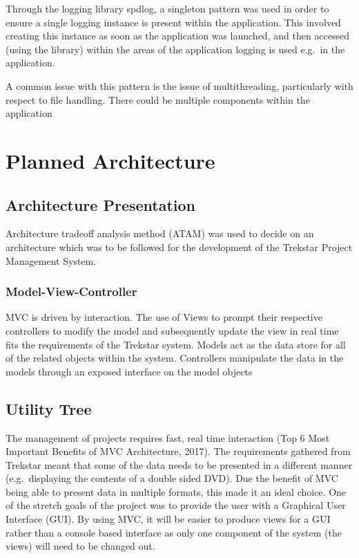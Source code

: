 \documentclass[
  english,
  a4paper,
,tablecaptionabove
]{scrartcl}
\begin{document}
Through the logging library spdlog, a singleton pattern was used in
order to ensure a single logging instance is present within the
application. This involved creating this instance as soon as the
application was launched, and then accessed (using the library) within
the areas of the application logging is used e.g.~in the application.

A common issue with this pattern is the issue of multithreading,
particularly with respect to file handling. There could be multiple
components within the application

\newpage

\hypertarget{planned-architecture}{%
\section{Planned Architecture}\label{planned-architecture}}

\hypertarget{architecture-presentation}{%
\subsection{Architecture Presentation}\label{architecture-presentation}}

Architecture tradeoff analysis method (ATAM) was used to decide on an
architecture which was to be followed for the development of the
Trekstar Project Management System.

\hypertarget{model-view-controller}{%
\subsubsection{Model-View-Controller}\label{model-view-controller}}

MVC is driven by interaction. The use of Views to prompt their
respective controllers to modify the model and subsequently update the
view in real time fits the requirements of the Trekstar system. Models
act as the data store for all of the related objects within the system.
Controllers manipulate the data in the models through an exposed
interface on the model objects

\hypertarget{utility-tree}{%
\subsection{Utility Tree}\label{utility-tree}}

The management of projects requires fast, real time interaction (Top 6
Most Important Benefits of MVC Architecture, 2017). The requirements
gathered from Trekstar meant that some of the data needs to be presented
in a different manner (e.g.~displaying the contents of a double sided
DVD). Due the benefit of MVC being able to present data in multiple
formats, this made it an ideal choice. One of the stretch goals of the
project was to provide the user with a Graphical User Interface (GUI).
By using MVC, it will be easier to produce views for a GUI rather than a
console based interface as only one component of the system (the views)
will need to be changed out.
\end{document}
